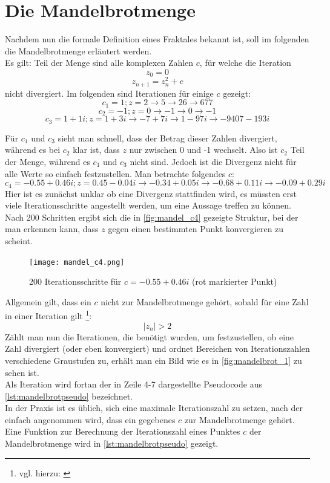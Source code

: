 \documentclass[a4paper,12pt,onesided]{report}
\begin{document}
\section{Die Mandelbrotmenge}
\label{sec:mandelbrotmath}
Nachdem nun die formale Definition eines Fraktales bekannt ist, soll im folgenden die Mandelbrotmenge erläutert werden.\\
Es gilt: Teil der Menge sind alle komplexen Zahlen $c$, für welche die Iteration
\[z_0=0\]
\[z_{n+1}=z_n^2 + c\]
nicht divergiert.
Im folgenden sind Iterationen für einige $c$ gezeigt:
\[c_1=1 ; z=2 \rightarrow 5 \rightarrow 26 \rightarrow 677\]
\[c_2=-1 ; z=0 \rightarrow -1 \rightarrow 0 \rightarrow -1\]
\[c_3=1+1i ; z=1+3i \rightarrow -7+7i \rightarrow 1-97i \rightarrow -9407-193i\]

Für $c_1$ und $c_3$ sieht man schnell, dass der Betrag dieser Zahlen divergiert, während es bei $c_2$ klar ist, dass $z$ nur zwischen 0 und -1 wechselt. Also ist $c_2$ Teil der Menge, während es $c_1$ und $c_3$ nicht sind. Jedoch ist die Divergenz nicht für alle Werte so einfach festzustellen. Man betrachte folgendes $c$:
\[c_4=-0.55 + 0.46i ; z=0.45 - 0.04i \rightarrow -0.34 + 0.05i \rightarrow -0.68 + 0.11i \rightarrow -0.09 + 0.29i\]
Hier ist es zunächst unklar ob eine Divergenz stattfinden wird, es müssten erst viele Iterationsschritte angestellt werden, um eine Aussage treffen zu können. Nach 200 Schritten ergibt sich die in \autoref{fig:mandel_c4} gezeigte Struktur, bei der man erkennen kann, dass $z$ gegen einen bestimmten Punkt konvergieren zu scheint.

\begin{figure}[H]
	\centering
	\texttt{[image: mandel\_c4.png]}
	\caption{200 Iterationsschritte für $c = -0.55 + 0.46i$ (rot markierter Punkt)}
	\label{fig:mandel_c4}
\end{figure}

Allgemein gilt, dass ein $c$ nicht zur Mandelbrotmenge gehört, sobald für eine Zahl in einer Iteration gilt \footnote{vgl. hierzu: \cite{mbrotg2}}:
\[|z_n|>2\]
Zählt man nun die Iterationen, die benötigt wurden, um festzustellen, ob eine Zahl divergiert (oder eben konvergiert) und ordnet Bereichen von Iterationszahlen verschiedene Graustufen zu, erhält man ein Bild wie es in \autoref{fig:mandelbrot_1} zu sehen ist.\\
Als Iteration wird fortan der in Zeile 4-7 dargestellte Pseudocode aus \autoref{lst:mandelbrotpseudo} bezeichnet.\\
In der Praxis ist es üblich, sich eine maximale Iterationszahl zu setzen, nach der einfach angenommen wird, dass ein gegebenes $c$ zur Mandelbrotmenge gehört.\\
Eine Funktion zur Berechnung der Iterationszahl eines Punktes $c$ der Mandelbrotmenge wird in \autoref{lst:mandelbrotpseudo} gezeigt.
\end{document}
